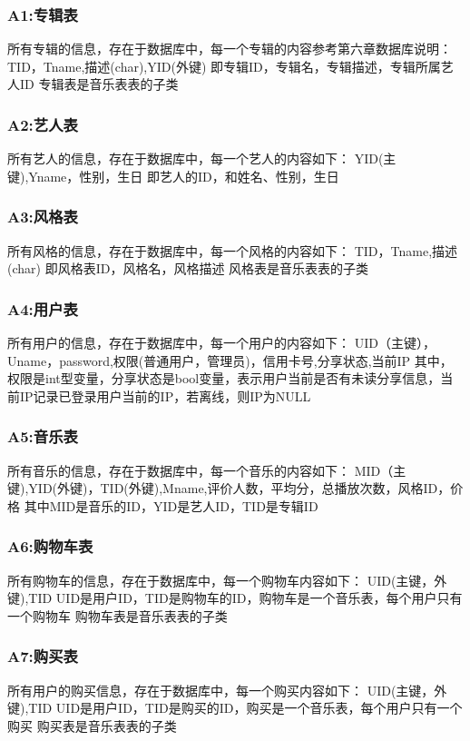 \subsubsection{A1:专辑表}

所有专辑的信息，存在于数据库中，每一个专辑的内容参考第六章数据库说明：
TID，Tname,描述(char),YID(外键)
即专辑ID，专辑名，专辑描述，专辑所属艺人ID
专辑表是音乐表表的子类

\subsubsection{A2:艺人表}

所有艺人的信息，存在于数据库中，每一个艺人的内容如下：
YID(主键),Yname，性别，生日
即艺人的ID，和姓名、性别，生日

\subsubsection{A3:风格表}

所有风格的信息，存在于数据库中，每一个风格的内容如下：
TID，Tname,描述(char)
即风格表ID，风格名，风格描述
风格表是音乐表表的子类

\subsubsection{A4:用户表}
所有用户的信息，存在于数据库中，每一个用户的内容如下：
UID（主键），Uname，password,权限(普通用户，管理员)，信用卡号,分享状态,当前IP
其中，权限是int型变量，分享状态是bool变量，表示用户当前是否有未读分享信息，当前IP记录已登录用户当前的IP，若离线，则IP为NULL

\subsubsection{A5:音乐表}
所有音乐的信息，存在于数据库中，每一个音乐的内容如下：
MID（主键),YID(外键)，TID(外键),Mname,评价人数，平均分，总播放次数，风格ID，价格
其中MID是音乐的ID，YID是艺人ID，TID是专辑ID

\subsubsection{A6:购物车表}
所有购物车的信息，存在于数据库中，每一个购物车内容如下：
UID(主键，外键),TID
UID是用户ID，TID是购物车的ID，购物车是一个音乐表，每个用户只有一个购物车
购物车表是音乐表表的子类

\subsubsection{A7:购买表}
所有用户的购买信息，存在于数据库中，每一个购买内容如下：
UID(主键，外键),TID
UID是用户ID，TID是购买的ID，购买是一个音乐表，每个用户只有一个购买
购买表是音乐表表的子类

